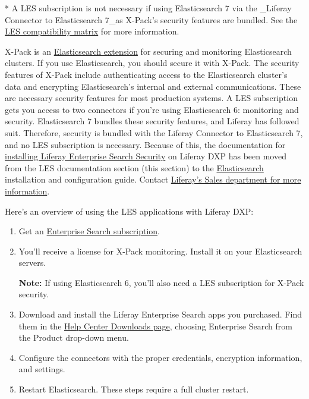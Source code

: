 * A LES subscription is not necessary if using Elasticsearch 7 via the
\_Liferay Connector to Elasticsearch 7\_as X-Pack's security features
are bundled. See the
\href{https://help.liferay.com/hc/en-us/articles/360016511651\#Liferay-Enterprise-Search}{LES
compatibility matrix} for more information.

X-Pack is an
\href{https://www.elastic.co/guide/en/elasticsearch/reference/7.x/setup-xpack.html}{Elasticsearch
extension} for securing and monitoring Elasticsearch clusters. If you
use Elasticsearch, you should secure it with X-Pack. The security
features of X-Pack include authenticating access to the Elasticsearch
cluster's data and encrypting Elasticsearch's internal and external
communications. These are necessary security features for most
production systems. A LES subscription gets you access to two connectors
if you're using Elasticsearch 6: monitoring and security. Elasticsearch
7 bundles these security features, and Liferay has followed suit.
Therefore, security is bundled with the Liferay Connector to
Elasticsearch 7, and no LES subscription is necessary. Because of this,
the documentation for
\href{/docs/7-2/deploy/-/knowledge_base/d/installing-liferay-enterprise-search-security}{installing
Liferay Enterprise Search Security} on Liferay DXP has been moved from
the LES documentation section (this section) to the
\href{/docs/7-2/deploy/-/knowledge_base/d/elasticsearch}{Elasticsearch}
installation and configuration guide. Contact
\href{https://www.liferay.com/contact-us\#contact-sales}{Liferay's Sales
department for more information}.

Here's an overview of using the LES applications with Liferay DXP:

\begin{enumerate}
\def\labelenumi{\arabic{enumi}.}
\item
  Get an
  \href{https://help.liferay.com/hc/en-us/articles/360014400932}{Enterprise
  Search subscription}.
\item
  You'll receive a license for X-Pack monitoring. Install it on your
  Elasticsearch servers.

  \textbf{Note:} If using Elasticsearch 6, you'll also need a LES
  subscription for X-Pack security.
\item
  Download and install the Liferay Enterprise Search apps you purchased.
  Find them in the \href{https://customer.liferay.com/en/downloads}{Help
  Center Downloads page}, choosing Enterprise Search from the Product
  drop-down menu.
\item
  Configure the connectors with the proper credentials, encryption
  information, and settings.
\item
  Restart Elasticsearch. These steps require a full cluster restart.
\end{enumerate}

